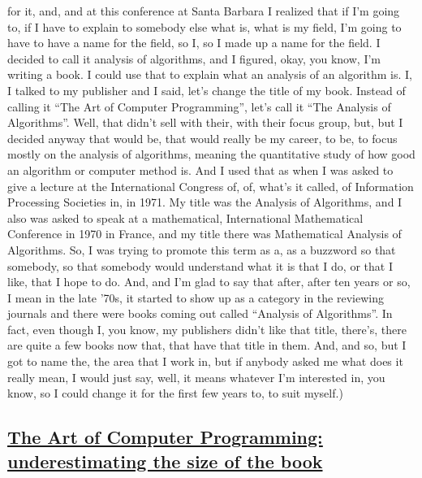 \documentclass[]{article}
\begin{document}
for it, and, and at this conference at Santa Barbara I realized that if
I'm going to, if I have to explain to somebody else what is, what is my
field, I'm going to have to have a name for the field, so I, so I made
up a name for the field. I decided to call it analysis of algorithms,
and I figured, okay, you know, I'm writing a book. I could use that to
explain what an analysis of an algorithm is. I, I talked to my publisher
and I said, let's change the title of my book. Instead of calling it
``The Art of Computer Programming'', let's call it ``The Analysis of
Algorithms''. Well, that didn't sell with their, with their focus group,
but, but I decided anyway that would be, that would really be my career,
to be, to focus mostly on the analysis of algorithms, meaning the
quantitative study of how good an algorithm or computer method is. And I
used that as when I was asked to give a lecture at the International
Congress of, of, what's it called, of Information Processing Societies
in, in 1971. My title was the Analysis of Algorithms, and I also was
asked to speak at a mathematical, International Mathematical Conference
in 1970 in France, and my title there was Mathematical Analysis of
Algorithms. So, I was trying to promote this term as a, as a buzzword so
that somebody, so that somebody would understand what it is that I do,
or that I like, that I hope to do. And, and I'm glad to say that after,
after ten years or so, I mean in the late '70s, it started to show up as
a category in the reviewing journals and there were books coming out
called ``Analysis of Algorithms''. In fact, even though I, you know, my
publishers didn't like that title, there's, there are quite a few books
now that, that have that title in them. And, and so, but I got to name
the, the area that I work in, but if anybody asked me what does it
really mean, I would just say, well, it means whatever I'm interested
in, you know, so I could change it for the first few years to, to suit
myself.)

\subsection{\texorpdfstring{\href{http://webofstories.com/play/17097}{The
Art of Computer Programming: underestimating the size of the
book}}{The Art of Computer Programming: underestimating the size of the book}}\label{the-art-of-computer-programming-underestimating-the-size-of-the-book}
\end{document}
